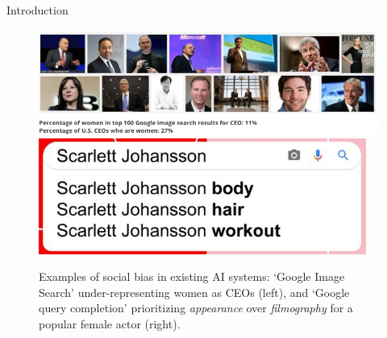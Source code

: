 \documentclass{beamer}
\begin{document}
%
\begin{frame}{Introduction}
%
\begin{figure}[t]
    \centering
    \includegraphics[width=.75\columnwidth]{ceo.png}
    \includegraphics[width=.24\columnwidth]{qc.png}
    \caption{Examples of social bias in existing AI systems: `Google Image Search' under-representing women as CEOs (left), and `Google query completion' prioritizing \emph{appearance} over \emph{filmography} for a popular female actor (right).}
    \label{fig:bias-in-existing-AI-tools}
\end{figure}
\end{frame}
%
\end{document}
